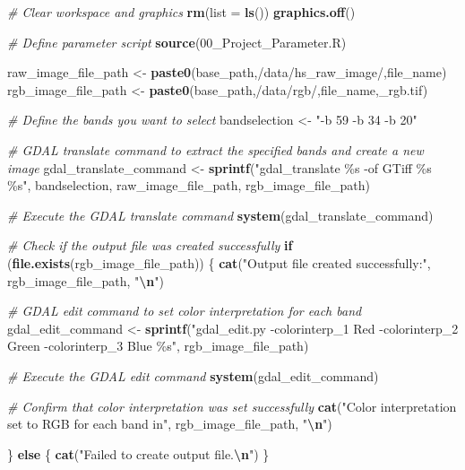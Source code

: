 \documentclass[
]{article}
\newenvironment{Shaded}{\begin{snugshade}}{\end{snugshade}}
\newcommand{\AttributeTok}[1]{\textcolor[rgb]{0.13,0.29,0.53}{#1}}
\newcommand{\CommentTok}[1]{\textcolor[rgb]{0.56,0.35,0.01}{\textit{#1}}}
\newcommand{\ControlFlowTok}[1]{\textcolor[rgb]{0.13,0.29,0.53}{\textbf{#1}}}
\newcommand{\FunctionTok}[1]{\textcolor[rgb]{0.13,0.29,0.53}{\textbf{#1}}}
\newcommand{\NormalTok}[1]{#1}
\newcommand{\OtherTok}[1]{\textcolor[rgb]{0.56,0.35,0.01}{#1}}
\newcommand{\SpecialCharTok}[1]{\textcolor[rgb]{0.81,0.36,0.00}{\textbf{#1}}}
\newcommand{\StringTok}[1]{\textcolor[rgb]{0.31,0.60,0.02}{#1}}
\begin{document}
\begin{Shaded}
\begin{Highlighting}[]
\CommentTok{\# Clear workspace and graphics}
\FunctionTok{rm}\NormalTok{(}\AttributeTok{list =} \FunctionTok{ls}\NormalTok{())}
\FunctionTok{graphics.off}\NormalTok{()}

\CommentTok{\# Define parameter script}
\FunctionTok{source}\NormalTok{(}\StringTok{\textquotesingle{}00\_Project\_Parameter.R\textquotesingle{}}\NormalTok{)}


\NormalTok{raw\_image\_file\_path }\OtherTok{\textless{}{-}} \FunctionTok{paste0}\NormalTok{(base\_path,}\StringTok{\textquotesingle{}/data/hs\_raw\_image/\textquotesingle{}}\NormalTok{,file\_name)}
\NormalTok{rgb\_image\_file\_path }\OtherTok{\textless{}{-}} \FunctionTok{paste0}\NormalTok{(base\_path,}\StringTok{\textquotesingle{}/data/rgb/\textquotesingle{}}\NormalTok{,file\_name,}\StringTok{\textquotesingle{}\_rgb.tif\textquotesingle{}}\NormalTok{)}

\CommentTok{\# Define the bands you want to select}
\NormalTok{bandselection }\OtherTok{\textless{}{-}} \StringTok{"{-}b 59 {-}b 34 {-}b 20"}

\CommentTok{\# GDAL translate command to extract the specified bands and create a new image}
\NormalTok{gdal\_translate\_command }\OtherTok{\textless{}{-}} \FunctionTok{sprintf}\NormalTok{(}\StringTok{"gdal\_translate \%s {-}of GTiff \%s \%s"}\NormalTok{, bandselection, raw\_image\_file\_path, rgb\_image\_file\_path)}

\CommentTok{\# Execute the GDAL translate command}
\FunctionTok{system}\NormalTok{(gdal\_translate\_command)}

\CommentTok{\# Check if the output file was created successfully}
\ControlFlowTok{if}\NormalTok{ (}\FunctionTok{file.exists}\NormalTok{(rgb\_image\_file\_path)) \{}
  \FunctionTok{cat}\NormalTok{(}\StringTok{"Output file created successfully:"}\NormalTok{, rgb\_image\_file\_path, }\StringTok{"}\SpecialCharTok{\textbackslash{}n}\StringTok{"}\NormalTok{)}

  \CommentTok{\# GDAL edit command to set color interpretation for each band}
\NormalTok{  gdal\_edit\_command }\OtherTok{\textless{}{-}} \FunctionTok{sprintf}\NormalTok{(}\StringTok{"gdal\_edit.py {-}colorinterp\_1 Red {-}colorinterp\_2 Green {-}colorinterp\_3 Blue \%s"}\NormalTok{, rgb\_image\_file\_path)}

  \CommentTok{\# Execute the GDAL edit command}
  \FunctionTok{system}\NormalTok{(gdal\_edit\_command)}

  \CommentTok{\# Confirm that color interpretation was set successfully}
  \FunctionTok{cat}\NormalTok{(}\StringTok{"Color interpretation set to RGB for each band in"}\NormalTok{, rgb\_image\_file\_path, }\StringTok{"}\SpecialCharTok{\textbackslash{}n}\StringTok{"}\NormalTok{)}

\NormalTok{\} }\ControlFlowTok{else}\NormalTok{ \{}
  \FunctionTok{cat}\NormalTok{(}\StringTok{"Failed to create output file.}\SpecialCharTok{\textbackslash{}n}\StringTok{"}\NormalTok{)}
\NormalTok{\}}
\end{Highlighting}
\end{Shaded}
\end{document}
